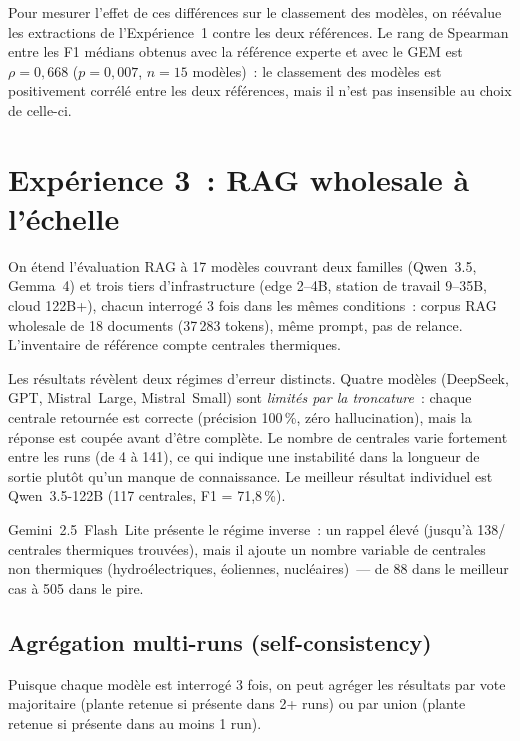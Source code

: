 \documentclass[a4paper,11pt]{report}
\begin{document}
Pour mesurer l'effet de ces différences sur le classement des modèles, on réévalue les extractions de l'Expérience~1 contre les deux références. Le rang de Spearman entre les F1 médians obtenus avec la référence experte et avec le GEM est $\rho = 0{,}668$ ($p = 0{,}007$, $n = 15$ modèles)~: le classement des modèles est positivement corrélé entre les deux références, mais il n'est pas insensible au choix de celle-ci.


\section{Expérience 3~: RAG wholesale à l'échelle}\label{sec:rag}

On étend l'évaluation RAG à 17 modèles couvrant deux familles (Qwen~3.5, Gemma~4) et trois tiers d'infrastructure (edge 2--4B, station de travail 9--35B, cloud 122B+), chacun interrogé 3 fois dans les mêmes conditions~: corpus RAG wholesale de 18 documents (37\,283 tokens), même prompt, pas de relance. L'inventaire de référence compte \NumRefPlants{} centrales thermiques.


Les résultats révèlent deux régimes d'erreur distincts. Quatre modèles (DeepSeek, GPT, Mistral~Large, Mistral~Small) sont \emph{limités par la troncature}~: chaque centrale retournée est correcte (précision 100\,\%, zéro hallucination), mais la réponse est coupée avant d'être complète. Le nombre de centrales varie fortement entre les runs (de 4 à 141), ce qui indique une instabilité dans la longueur de sortie plutôt qu'un manque de connaissance. Le meilleur résultat individuel est Qwen~3.5-122B (117 centrales, F1 = 71,8\,\%).

Gemini~2.5~Flash~Lite présente le régime inverse~: un rappel élevé (jusqu'à 138/\NumRefPlants{} centrales thermiques trouvées), mais il ajoute un nombre variable de centrales non thermiques (hydroélectriques, éoliennes, nucléaires)~--- de 88 dans le meilleur cas à 505 dans le pire.

\subsection{Agrégation multi-runs (self-consistency)}

Puisque chaque modèle est interrogé 3 fois, on peut agréger les résultats par vote majoritaire (plante retenue si présente dans 2+ runs) ou par union (plante retenue si présente dans au moins 1 run).
\end{document}
